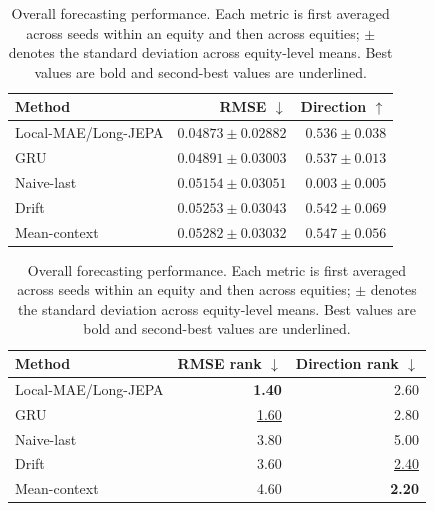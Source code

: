 \begin{table}[t]
\centering
\small
\caption{Overall forecasting performance. Each metric is first averaged across seeds within an equity and then across equities; $\pm$ denotes the standard deviation across equity-level means. Best values are bold and second-best values are underlined.}
\label{tab:main_metrics}
\begin{tabular}{lrr}
\toprule
Method & RMSE $\downarrow$ & Direction $\uparrow$ \\
\midrule
Local-MAE/Long-JEPA & \textbf{$0.04873 \pm 0.02882$} & $0.536 \pm 0.038$ \\
GRU & \underline{$0.04891 \pm 0.03003$} & $0.537 \pm 0.013$ \\
Naive-last & $0.05154 \pm 0.03051$ & $0.003 \pm 0.005$ \\
Drift & $0.05253 \pm 0.03043$ & \underline{$0.542 \pm 0.069$} \\
Mean-context & $0.05282 \pm 0.03032$ & \textbf{$0.547 \pm 0.056$} \\
\bottomrule
\end{tabular}
\par\medskip
\begin{tabular}{lrr}
\toprule
Method & RMSE rank $\downarrow$ & Direction rank $\downarrow$ \\
\midrule
Local-MAE/Long-JEPA & \textbf{1.40} & 2.60 \\
GRU & \underline{1.60} & 2.80 \\
Naive-last & 3.80 & 5.00 \\
Drift & 3.60 & \underline{2.40} \\
Mean-context & 4.60 & \textbf{2.20} \\
\bottomrule
\end{tabular}
\end{table}
